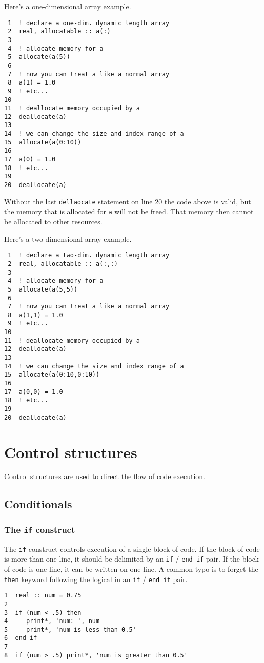 \documentclass[11pt]{article}
\begin{document}
Here's a one-dimensional array example.
\begin{verbatim}
 1  ! declare a one-dim. dynamic length array
 2  real, allocatable :: a(:)
 3  
 4  ! allocate memory for a
 5  allocate(a(5))
 6  
 7  ! now you can treat a like a normal array
 8  a(1) = 1.0
 9  ! etc...
10  
11  ! deallocate memory occupied by a
12  deallocate(a)
13  
14  ! we can change the size and index range of a
15  allocate(a(0:10))
16  
17  a(0) = 1.0
18  ! etc...
19  
20  deallocate(a)
\end{verbatim}

Without the last \texttt{dellaocate} statement on line 20 the code above is valid, but the memory that is allocated for \texttt{a} will not be freed. That memory then cannot be allocated to other resources.

Here's a two-dimensional array example.
\begin{verbatim}
 1  ! declare a two-dim. dynamic length array
 2  real, allocatable :: a(:,:)
 3  
 4  ! allocate memory for a
 5  allocate(a(5,5))
 6  
 7  ! now you can treat a like a normal array
 8  a(1,1) = 1.0
 9  ! etc...
10  
11  ! deallocate memory occupied by a
12  deallocate(a)
13  
14  ! we can change the size and index range of a
15  allocate(a(0:10,0:10))
16  
17  a(0,0) = 1.0
18  ! etc...
19  
20  deallocate(a)
\end{verbatim}

\section{Control structures}
\label{sec:orgheadline11}
Control structures are used to direct the flow of code execution.
\subsection{Conditionals}
\label{sec:orgheadline27}
\subsubsection{The \texttt{if} construct}
\label{sec:orgheadline24}
The \texttt{if} construct controls execution of a single block of code. If the block of code is more than one line, it should be delimited by an \texttt{if} / \texttt{end if} pair. If the block of code is one line, it can be written on one line. A common typo is to forget the \texttt{then} keyword following the logical in an \texttt{if} / \texttt{end if} pair.

\begin{verbatim}
1  real :: num = 0.75
2  
3  if (num < .5) then
4     print*, 'num: ', num
5     print*, 'num is less than 0.5'
6  end if
7  
8  if (num > .5) print*, 'num is greater than 0.5'
\end{verbatim}
\end{document}
